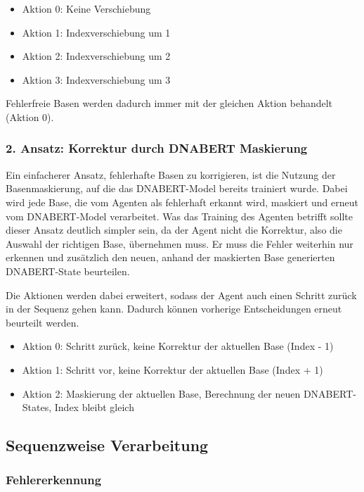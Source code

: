\documentclass[oneside,bibliography=totocnumbered,BCOR=5mm]{scrbook}%
\theoremstyle{definition}
\theoremstyle{definition}
\theoremstyle{definition}
\theoremstyle{definition}
\theoremstyle{definition}
\theoremstyle{definition}
\begin{document}
\begin{itemize}
  \item Aktion 0: Keine Verschiebung
  \item Aktion 1: Indexverschiebung um 1
  \item Aktion 2: Indexverschiebung um 2
  \item Aktion 3: Indexverschiebung um 3
\end{itemize}

Fehlerfreie Basen werden dadurch immer mit der gleichen Aktion behandelt (Aktion 0). 


\subsubsection{2. Ansatz: Korrektur durch DNABERT Maskierung}
Ein einfacherer Ansatz, fehlerhafte Basen zu korrigieren, ist die Nutzung der
Basenmaskierung, auf die das DNABERT-Model bereits trainiert wurde. 
Dabei wird jede Base, die vom Agenten als fehlerhaft erkannt wird, 
maskiert und erneut vom DNABERT-Model verarbeitet.
Was das Training des Agenten betrifft sollte dieser Ansatz deutlich simpler sein,
da der Agent nicht die Korrektur, also die Auswahl der richtigen Base, übernehmen muss.
Er muss die Fehler weiterhin nur erkennen und zusätzlich den neuen, 
anhand der maskierten Base generierten DNABERT-State beurteilen.

Die Aktionen werden dabei erweitert, sodass der Agent auch einen Schritt zurück in der Sequenz gehen kann.
Dadurch können vorherige Entscheidungen erneut beurteilt werden.

\begin{itemize}
  \item Aktion 0: Schritt zurück, keine Korrektur der aktuellen Base (Index - 1)
  \item Aktion 1: Schritt vor, keine Korrektur der aktuellen Base  (Index + 1)
  \item Aktion 2: Maskierung der aktuellen Base, Berechnung der neuen DNABERT-States, Index bleibt gleich
\end{itemize}



\subsection{Sequenzweise Verarbeitung}
\subsubsection{Fehlererkennung}
\end{document}
